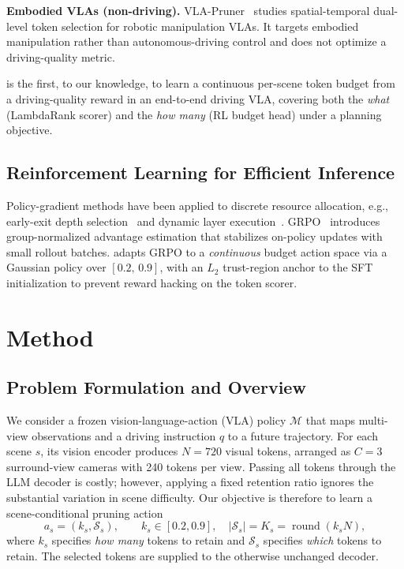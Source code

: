 \documentclass[letterpaper]{article} %
\begin{document}
\textbf{Embodied VLAs (non-driving).}
VLA-Pruner~\citep{vlapruner2025} studies spatial-temporal dual-level token
selection for robotic manipulation VLAs.
It targets embodied manipulation rather than autonomous-driving control and does
not optimize a driving-quality metric.

\ours{} is the first, to our knowledge, to learn a continuous per-scene token
budget from a driving-quality reward in an end-to-end driving VLA, covering both
the \emph{what} (LambdaRank scorer) and the \emph{how many} (RL budget head)
under a planning objective.

\subsection{Reinforcement Learning for Efficient Inference}

Policy-gradient methods have been applied to discrete resource allocation,
e.g., early-exit depth selection~\citep{elbayad2020depth} and dynamic layer
execution~\citep{wang2018skipnet}.
GRPO~\citep{shao2024deepseekmath} introduces group-normalized advantage
estimation that stabilizes on-policy updates with small rollout batches.
\ours{} adapts GRPO to a \emph{continuous} budget action space via a Gaussian
policy over $[0.2,\,0.9]$, with an $L_2$ trust-region anchor to the SFT
initialization to prevent reward hacking on the token scorer.


\section{Method}
\label{sec:method}

\subsection{Problem Formulation and Overview}

We consider a frozen vision-language-action (VLA) policy $\mathcal{M}$ that
maps multi-view observations and a driving instruction $q$ to a future
trajectory. For each scene $s$, its vision encoder produces $N{=}720$ visual
tokens, arranged as $C{=}3$ surround-view cameras with 240 tokens per view.
Passing all tokens through the LLM decoder is costly; however, applying a fixed
retention ratio ignores the substantial variation in scene difficulty. Our
objective is therefore to learn a scene-conditional pruning action
\begin{equation}
    a_s = (k_s,\mathcal{S}_s), \qquad
    k_s \in [0.2,0.9], \quad
    |\mathcal{S}_s| = K_s = \operatorname{round}(k_sN),
\end{equation}
where $k_s$ specifies \emph{how many} tokens to retain and $\mathcal{S}_s$
specifies \emph{which} tokens to retain. The selected tokens are supplied to
the otherwise unchanged decoder.
\end{document}
